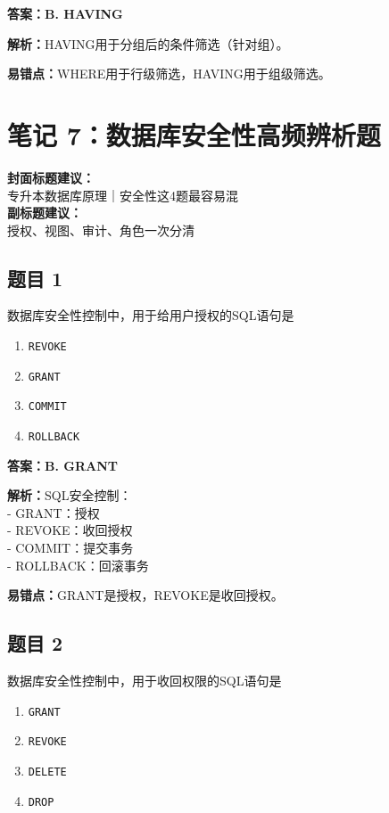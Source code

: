 \documentclass[12pt,a4paper]{ctexart}
\begin{document}
\begin{answerbox}
	\textbf{答案：B. HAVING}

	\textbf{解析：}HAVING用于分组后的条件筛选（针对组）。

	\textbf{易错点：}WHERE用于行级筛选，HAVING用于组级筛选。
\end{answerbox}

\newpage

\section{笔记 7：数据库安全性高频辨析题}
\begin{coverbox}
	\textbf{封面标题建议：}\\
	专升本数据库原理｜安全性这4题最容易混\\
	\textbf{副标题建议：}\\
	授权、视图、审计、角色一次分清
\end{coverbox}

\subsection*{题目 1}
数据库安全性控制中，用于给用户授权的SQL语句是
\begin{enumerate}[label=\Alph*.]
	\item \texttt{REVOKE}
	\item \texttt{GRANT}
	\item \texttt{COMMIT}
	\item \texttt{ROLLBACK}
\end{enumerate}

\begin{answerbox}
	\textbf{答案：B. GRANT}

	\textbf{解析：}SQL安全控制：\\
	- GRANT：授权\\
	- REVOKE：收回授权\\
	- COMMIT：提交事务\\
	- ROLLBACK：回滚事务

	\textbf{易错点：}GRANT是授权，REVOKE是收回授权。
\end{answerbox}

\subsection*{题目 2}
数据库安全性控制中，用于收回权限的SQL语句是
\begin{enumerate}[label=\Alph*.]
	\item \texttt{GRANT}
	\item \texttt{REVOKE}
	\item \texttt{DELETE}
	\item \texttt{DROP}
\end{enumerate}
\end{document}
